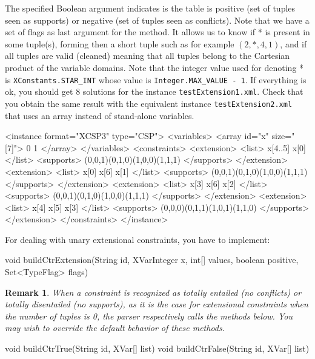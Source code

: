 \documentclass[10pt]{article}
\newenvironment{boxabsc}
               {\medskip \begin{bclogo}[barre=none,arrondi=0.2,logo=]{}\vspace{-0.6cm}}
               {\vspace{-0.1cm}\end{bclogo} \smallskip}
\newtheorem{remark}{Remark}
\newcommand{\nn}[1]{{\tt #1}} %
\begin{document}
The specified Boolean argument indicates is the table is positive (set of tuples seen as supports) or negative (set of tuples seen as conflicts). Note that we have a set of flags as last argument for the method. 
It allows us to know if * is present in some tuple(s), forming then a short tuple such as for example $(2,*,4,1)$, and if all tuples are valid (cleaned) meaning that all tuples belong to the Cartesian product of the variable domains. Note that the integer value used for denoting * is \verb!XConstants.STAR_INT! whose value is \verb!Integer.MAX_VALUE - 1!.
If everything is ok, you should get 8 solutions for the instance \nn{testExtension1.xml}.
Check that you obtain the same result with the equivalent instance \nn{testExtension2.xml} that uses an array instead of stand-alone variables.

\begin{boxabsc}
\begin{absc}
<instance format="XCSP3" type="CSP">
  <variables>
    <array id="x" size="[7]"> 0 1 </array>
  </variables>
  <constraints>
    <extension>
      <list> x[4..5] x[0] </list>
      <supports> (0,0,1)(0,1,0)(1,0,0)(1,1,1) </supports>
    </extension>
    <extension>
      <list> x[0] x[6] x[1] </list>
      <supports> (0,0,1)(0,1,0)(1,0,0)(1,1,1) </supports>
    </extension>
    <extension>
      <list> x[3] x[6] x[2] </list>
      <supports> (0,0,1)(0,1,0)(1,0,0)(1,1,1) </supports>
    </extension>
    <extension>
      <list> x[4] x[5] x[3] </list>
      <supports> (0,0,0)(0,1,1)(1,0,1)(1,1,0) </supports>
    </extension>
  </constraints>
</instance>
\end{absc} 
\end{boxabsc}


For dealing with unary extensional constraints, you have to implement:
\begin{boxabsc}
\begin{absc}
void buildCtrExtension(String id, XVarInteger x, int[] values, boolean positive, Set<TypeFlag> flags)
\end{absc} 
\end{boxabsc}

\begin{remark}
When a constraint is recognized as totally entailed (no conflicts) or totally disentailed (no supports), as it is the case for extensional constraints when the number of tuples is 0, the parser respectively calls the methods below.
You may wish to override the default behavior of these methods.
\end{remark}
\begin{absc}
 void buildCtrTrue(String id, XVar[] list)
 void buildCtrFalse(String id, XVar[] list) 
\end{absc} 
\end{document}
